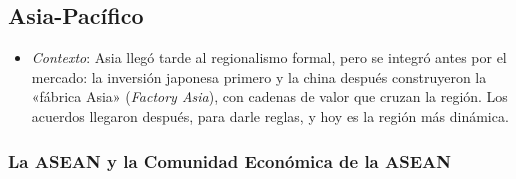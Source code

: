 \documentclass[11pt]{article}
\begin{document}
\subsection{Asia-Pacífico}\label{sec:asia}

\begin{itemize}
\item \emph{Contexto}: Asia llegó tarde al regionalismo formal, pero se integró antes por el mercado: la inversión japonesa primero y la china después construyeron la «fábrica Asia» (\emph{Factory Asia}), con cadenas de valor que cruzan la región. Los acuerdos llegaron después, para darle reglas, y hoy es la región más dinámica.
\end{itemize}

\subsubsection{La ASEAN y la Comunidad Económica de la ASEAN}\label{sec:asean}
\end{document}
